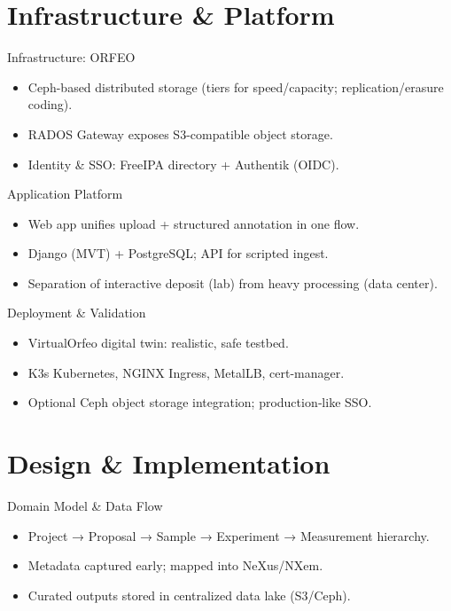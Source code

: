 \documentclass[aspectratio=169]{beamer}
\begin{document}
\section{Infrastructure \& Platform}
\begin{frame}{Infrastructure: ORFEO}
\begin{itemize}
\item Ceph-based distributed storage (tiers for speed/capacity; replication/erasure coding).
\item RADOS Gateway exposes S3-compatible object storage.
\item Identity \& SSO: FreeIPA directory + Authentik (OIDC).
\end{itemize}
\end{frame}

\begin{frame}{Application Platform}
\begin{itemize}
\item Web app unifies upload + structured annotation in one flow.
\item Django (MVT) + PostgreSQL; API for scripted ingest.
\item Separation of interactive deposit (lab) from heavy processing (data center).
\end{itemize}
\end{frame}

\begin{frame}{Deployment \& Validation}
\begin{itemize}
\item VirtualOrfeo digital twin: realistic, safe testbed.
\item K3s Kubernetes, NGINX Ingress, MetalLB, cert-manager.
\item Optional Ceph object storage integration; production‑like SSO.
\end{itemize}
\end{frame}

\section{Design \& Implementation}
\begin{frame}{Domain Model \& Data Flow}
\begin{itemize}
\item Project → Proposal → Sample → Experiment → Measurement hierarchy.
\item Metadata captured early; mapped into NeXus/NXem.
\item Curated outputs stored in centralized data lake (S3/Ceph).
\end{itemize}
\end{frame}
\end{document}
